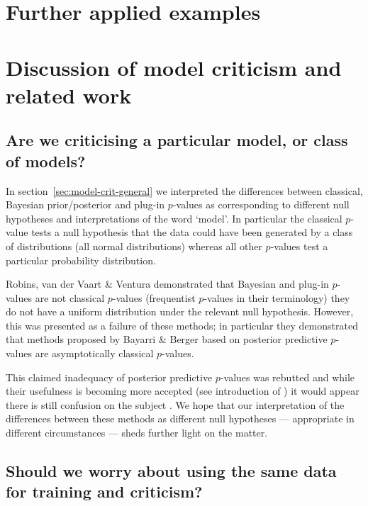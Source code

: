 \section{Further applied examples}


\section{Discussion of model criticism and related work}

\subsection{Are we criticising a particular model, or class of models?}

In section~\ref{sec:model-crit-general} we interpreted the differences between classical, Bayesian prior/posterior and plug-in $p$-values as corresponding to different null hypotheses and interpretations of the word `model'.
In particular the classical $p$-value tests a null hypothesis that the data could have been generated by a class of distributions (\eg all normal distributions) whereas all other $p$-values test a particular probability distribution.

Robins, van der Vaart \& Ventura \citep{Robins2000-oz} demonstrated that Bayesian and plug-in $p$-values are not classical $p$-values (frequentist $p$-values in their terminology) \ie they do not have a uniform distribution under the relevant null hypothesis.
However, this was presented as a failure of these methods; in particular they demonstrated that methods proposed by Bayarri \& Berger \citep{Bayarri1999-ty} based on posterior predictive $p$-values are asymptotically classical $p$-values.

This claimed inadequacy of posterior predictive $p$-values was rebutted \citep{Gelman2003-xx} and while their usefulness is becoming more accepted (see \eg introduction of \cite{Bayarri2007-cp}) it would appear there is still confusion on the subject \citep{Gelman2013-am}.
We hope that our interpretation of the differences between these methods as different null hypotheses --- appropriate in different circumstances --- sheds further light on the matter.

\subsection{Should we worry about using the same data for training and criticism?}

